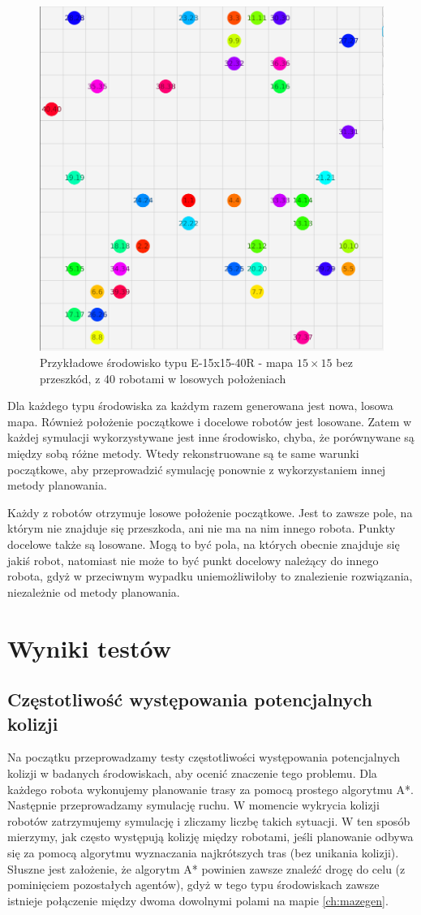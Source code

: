 \begin{figure}
	\centering
	\includegraphics[width=0.6\columnwidth]{img/robopath/tests-15-15-empty-40}
	\caption{Przykładowe środowisko typu E-15x15-40R - mapa $15 \times 15$ bez przeszkód, z 40 robotami w losowych położeniach}
	\label{fig:test-env-15-15-empty-40}
\end{figure}

Dla każdego typu środowiska za każdym razem generowana jest nowa, losowa mapa. Również położenie początkowe i docelowe robotów jest losowane. Zatem w każdej symulacji wykorzystywane jest inne środowisko, chyba, że porównywane są między sobą różne metody. Wtedy rekonstruowane są te same warunki początkowe, aby przeprowadzić symulację ponownie z wykorzystaniem innej metody planowania.

Każdy z robotów otrzymuje losowe położenie początkowe. Jest to zawsze pole, na którym nie znajduje się przeszkoda, ani nie ma na nim innego robota.
Punkty docelowe także są losowane. Mogą to być pola, na których obecnie znajduje się jakiś robot, natomiast nie może to być punkt docelowy należący do innego robota, gdyż w przeciwnym wypadku uniemożliwiłoby to znalezienie rozwiązania, niezależnie od metody planowania.

\section{Wyniki testów}
\label{ch:test-results}
\subsection{Częstotliwość występowania potencjalnych kolizji} %
Na początku przeprowadzamy testy częstotliwości występowania potencjalnych kolizji w badanych środowiskach, aby ocenić znaczenie tego problemu.
Dla każdego robota wykonujemy planowanie trasy za pomocą prostego algorytmu A*. Następnie przeprowadzamy symulację ruchu. W momencie wykrycia kolizji robotów zatrzymujemy symulację i zliczamy liczbę takich sytuacji. W ten sposób mierzymy, jak często występują kolizję między robotami, jeśli planowanie odbywa się za pomocą algorytmu wyznaczania najkrótszych tras (bez unikania kolizji).
Słuszne jest założenie, że algorytm A* powinien zawsze znaleźć drogę do celu (z pominięciem pozostałych agentów), gdyż w tego typu środowiskach zawsze istnieje połączenie między dwoma dowolnymi polami na mapie \ref{ch:mazegen}.

